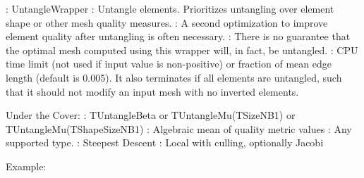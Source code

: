 : UntangleWrapper \newline
{}: Untangle elements.  Prioritizes untangling over
element shape or other mesh quality measures.  \newline
{}: A second optimization to improve element quality
after untangling is often necessary.  \newline
{}: There is no guarantee that the optimal mesh computed using this wrapper will, in fact, be untangled.  \newline 
{}: CPU time limit (not used if input 
value is non-positive) or fraction of mean edge length (default is 0.005).  It
also terminates if all elements are untangled, such that it should not modify
an input mesh with no inverted elements. \newline \newline

\noindent Under the Cover: \newline
{}: TUntangleBeta or TUntangleMu(TSizeNB1) or TUntangleMu(TShapeSizeNB1) \newline
{}: Algebraic mean of quality metric values \newline
{}: Any supported type. \newline
{}: Steepest Descent \newline
{}: Local with culling, optionally Jacobi \newline

\noindent Example: \newline

